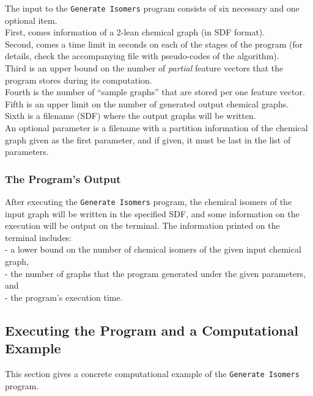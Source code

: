 \documentclass[11pt,titlepage,dvipdfmx,twoside]{article}
\begin{document}
The input to the {\tt Generate Isomers} program
consists of six necessary and one optional item. \\
First, comes information of a 2-lean chemical graph (in SDF format).\\
Second, comes a time limit in seconds on each of the stages of the program 
(for details, check the accompanying file with pseudo-codes of the algorithm).\\
Third is an upper bound on the number of {\em partial} feature vectors that the program stores
during its computation. \\
Fourth is the number of ``sample graphs'' that are stored per one feature vector.\\
Fifth is an upper limit on the number of generated output chemical graphs. \\
Sixth is a filename (SDF) where the output graphs will be written.\\
An optional parameter is a filename with a partition information of
the chemical graph given as the first parameter, and if given, it must be last
in the list of parameters.



\subsubsection{The Program's Output}
\label{sec:Output_m}

After executing the {\tt Generate Isomers} program,
the chemical isomers of the input graph will be written
in the specified SDF, and some information on the execution will be output on 
the terminal.
The information printed on the terminal includes:\\
 - a lower bound on the number of chemical isomers of the given input chemical graph, \\
 - the number of graphs that the program generated under the given parameters, and \\
 - the program's execution time.
 


\subsection{Executing the Program and a Computational Example}
\label{sec:Example_m}

This section gives a concrete computational example of the {\tt Generate Isomers} program.
\end{document}
